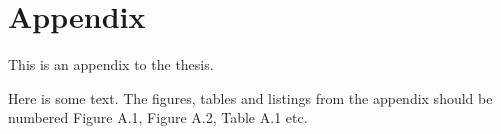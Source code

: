 \section*{Appendix}


This is an appendix to the thesis.

Here is some text. The figures, tables and listings from the appendix should be numbered Figure A.1, Figure A.2, Table A.1 etc. 


\clearpage